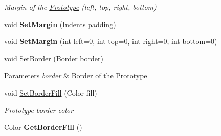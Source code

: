 \begin{DoxyCompactItemize}
\begin{DoxyCompactList}\small\item\em Margin of the \mbox{\hyperlink{class_space_v_i_l_1_1_prototype}{Prototype}} (left, top, right, bottom) \end{DoxyCompactList}\item 
\mbox{\label{class_space_v_i_l_1_1_prototype_a3b6065f192db7ffb7874d96d5f58ec5a}} 
void {\bfseries Set\+Margin} (\mbox{\hyperlink{struct_space_v_i_l_1_1_decorations_1_1_indents}{Indents}} padding)
\item 
\mbox{\label{class_space_v_i_l_1_1_prototype_ac8ff5d679af7a825dc63831b2f043f9a}} 
void {\bfseries Set\+Margin} (int left=0, int top=0, int right=0, int bottom=0)
\item 
\mbox{\label{class_space_v_i_l_1_1_prototype_a0b5d107aa8d9b62508b37874b8bf4751}} 
void \mbox{\hyperlink{class_space_v_i_l_1_1_prototype_a0b5d107aa8d9b62508b37874b8bf4751}{Set\+Border}} (\mbox{\hyperlink{class_space_v_i_l_1_1_decorations_1_1_border}{Border}} border)
\begin{DoxyCompactList}\small\item\em 
\begin{DoxyParams}{Parameters}
{\em border} & Border of the \mbox{\hyperlink{class_space_v_i_l_1_1_prototype}{Prototype}} \\
\hline
\end{DoxyParams}
\end{DoxyCompactList}\item 
void \mbox{\hyperlink{class_space_v_i_l_1_1_prototype_a85d92e82dcd890f026c72bb04dfa2dd3}{Set\+Border\+Fill}} (Color fill)
\begin{DoxyCompactList}\small\item\em \mbox{\hyperlink{class_space_v_i_l_1_1_prototype}{Prototype}} border color \end{DoxyCompactList}\item 
\mbox{\label{class_space_v_i_l_1_1_prototype_a7a730812682029b2a5c240e7137c5750}} 
Color {\bfseries Get\+Border\+Fill} ()
\item 
\mbox{\label{class_space_v_i_l_1_1_prototype_a00d29da19398d61310ab4dd9b927e411}} 

\end{DoxyCompactItemize}
